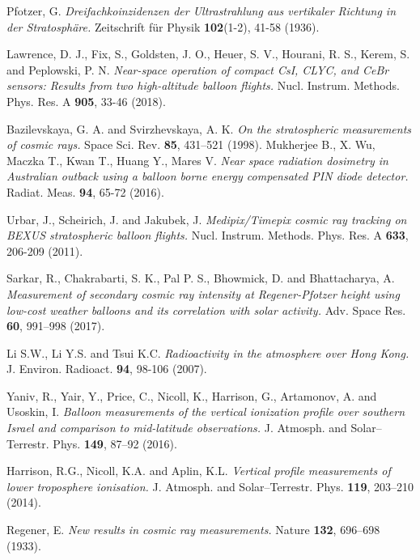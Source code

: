 \documentclass{Rpd}
\begin{document}
\begin{thebibliography}{99.}%

 Pfotzer, G. {\it Dreifachkoinzidenzen der Ultrastrahlung aus vertikaler Richtung in der Stratosphäre.} Zeitschrift für Physik {\bf 102}(1-2), 41-58 (1936).

 Lawrence, D. J., Fix, S., Goldsten, J. O., Heuer, S. V., Hourani, R. S., Kerem, S. and Peplowski, P. N. {\it Near-space operation of compact CsI, CLYC, and CeBr sensors: Results from two high-altitude balloon flights.} Nucl. Instrum. Methods. Phys. Res. A {\bf 905}, 33-46 (2018).

 Bazilevskaya, G. A. and Svirzhevskaya, A. K. {\it On the stratospheric measurements of cosmic rays.} Space Sci. Rev. {\bf 85}, 431–521 (1998).
 Mukherjee B., X. Wu, Maczka T., Kwan T., Huang Y., Mares V. {\it Near space radiation dosimetry in Australian outback using a balloon borne energy compensated PIN diode detector.} Radiat. Meas. {\bf 94}, 65-72 (2016). 

 Urbar, J., Scheirich, J. and Jakubek, J. {\it Medipix/Timepix cosmic ray tracking on BEXUS stratospheric balloon flights.} Nucl. Instrum. Methods. Phys. Res. A {\bf 633}, 206-209 (2011). 

 Sarkar, R., Chakrabarti, S. K., Pal P. S., Bhowmick, D. and Bhattacharya, A. {\it Measurement of secondary cosmic ray intensity at Regener-Pfotzer height using low-cost weather balloons and its correlation with solar activity.} Adv. Space Res. {\bf 60}, 991–998 (2017). 

 Li S.W., Li Y.S. and Tsui K.C. {\it Radioactivity in the atmosphere over Hong Kong.} J. Environ. Radioact. {\bf 94}, 98-106 (2007). 
	
 Yaniv, R., Yair, Y., Price, C., Nicoll, K., Harrison, G., Artamonov, A. and Usoskin, I. {\it Balloon measurements of the vertical ionization profile over southern Israel and comparison to mid-latitude observations.} J. Atmosph. and Solar–Terrestr. Phys. {\bf 149}, 87–92 (2016). 

 Harrison, R.G., Nicoll, K.A. and Aplin, K.L. {\it Vertical profile measurements of lower troposphere ionisation.} J. Atmosph. and Solar–Terrestr. Phys. {\bf 119}, 203–210 (2014). 

 Regener, E. {\it New results in cosmic ray measurements.} Nature {\bf 132}, 696–698 (1933).


\end{thebibliography}
\end{document}
